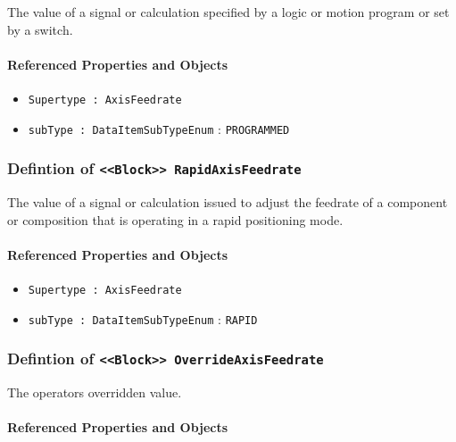 The value of a signal or calculation specified by a logic or motion program or set by a switch.

\FloatBarrier
\paragraph{Referenced Properties and Objects}

\begin{itemize}
\item \texttt{Supertype : AxisFeedrate}

\item \texttt{subType : DataItemSubTypeEnum} : \texttt{PROGRAMMED}

\end{itemize}
\FloatBarrier
\subsubsection{Defintion of \texttt{<<Block>> RapidAxisFeedrate}}
  \label{type:RapidAxisFeedrate}

\FloatBarrier

The value of a signal or calculation issued to adjust the feedrate of a component or composition that is operating in a rapid positioning mode.

\FloatBarrier
\paragraph{Referenced Properties and Objects}

\begin{itemize}
\item \texttt{Supertype : AxisFeedrate}

\item \texttt{subType : DataItemSubTypeEnum} : \texttt{RAPID}

\end{itemize}
\FloatBarrier
\subsubsection{Defintion of \texttt{<<Block>> OverrideAxisFeedrate}}
  \label{type:OverrideAxisFeedrate}

\FloatBarrier

The operators overridden value.

\FloatBarrier
\paragraph{Referenced Properties and Objects}

